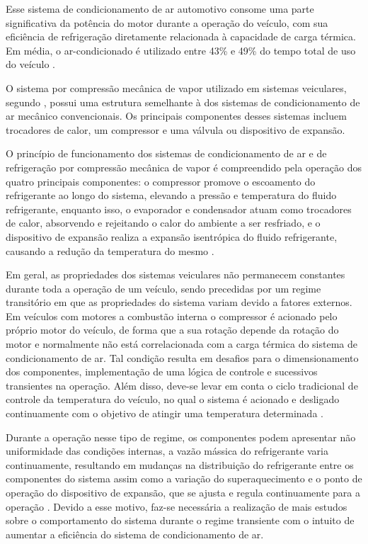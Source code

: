 Esse sistema de condicionamento de ar automotivo consome uma parte significativa da potência do motor durante a operação do veículo, com sua eficiência de refrigeração diretamente relacionada à capacidade de carga térmica. Em média, o ar-condicionado é utilizado entre 43\% e 49\% do tempo total de uso do veículo \cite{farrington2000}.

O sistema por compressão mecânica de vapor utilizado em sistemas veiculares, segundo  \textcite{dasilva2016}, possui uma estrutura semelhante à dos sistemas de condicionamento de ar mecânico convencionais. Os principais componentes desses sistemas incluem trocadores de calor, um compressor e uma válvula ou dispositivo de expansão.

O princípio de funcionamento dos sistemas de condicionamento de ar e de refrigeração por compressão mecânica de vapor é compreendido pela operação dos quatro principais componentes: o compressor promove o escoamento do refrigerante ao longo do sistema, elevando a pressão e temperatura do fluido refrigerante, enquanto isso, o evaporador e condensador atuam como trocadores de calor, absorvendo e rejeitando o calor do ambiente a ser resfriado, e o dispositivo de expansão realiza a expansão isentrópica do fluido refrigerante, causando a redução da temperatura do mesmo \cite{junior2023}.

Em geral, as propriedades dos sistemas veiculares não permanecem constantes durante toda a operação de um veículo, sendo precedidas por um regime transitório em que as propriedades do sistema variam devido a fatores externos. Em veículos com motores a combustão interna o compressor é acionado pelo próprio motor do veículo, de forma que a sua rotação depende da rotação do motor e normalmente não está correlacionada com a carga térmica do sistema de condicionamento de ar. Tal condição resulta em desafios para o dimensionamento dos componentes, implementação de uma lógica de controle e sucessivos transientes na operação. Além disso, deve-se levar em conta o ciclo tradicional de controle da temperatura do veículo, no qual o sistema é acionado e desligado continuamente com o objetivo de atingir uma temperatura determinada \cite{juliani2017}.

Durante a operação nesse tipo de regime, os componentes podem apresentar não uniformidade das condições internas, a vazão mássica do refrigerante varia continuamente, resultando em mudanças na distribuição do refrigerante entre os componentes do sistema assim como a variação do superaquecimento e o ponto de operação do dispositivo de expansão, que se ajusta e regula continuamente para a operação \cite{rangel2007}. Devido a esse motivo, faz-se necessária a realização de mais estudos sobre o comportamento do sistema durante o regime transiente com o intuito de aumentar a eficiência do sistema de condicionamento de ar.

